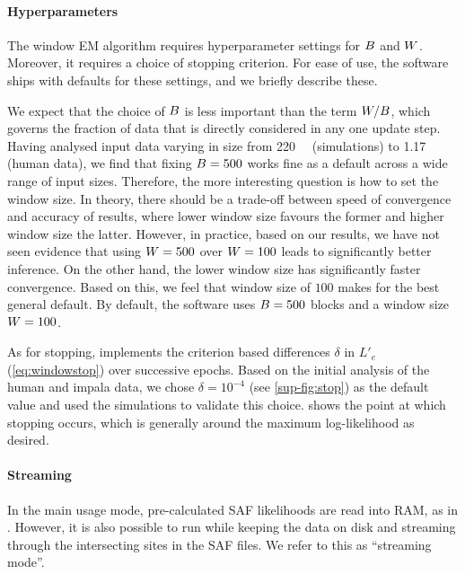 \paragraph{Hyperparameters}

The window EM algorithm requires hyperparameter settings for $B$ and $W$.
Moreover, it requires a choice of stopping criterion.
For ease of use, the \winsfs software ships with defaults for these settings, and we briefly describe these.

We expect that the choice of $B$ is less important than the term $W / B$, which governs the fraction of data that is directly considered in any one update step.
Having analysed input data varying in size from \SI{220}{\mega\bases} (simulations) to \SI{1.17}{\giga\bases} (human data), we find that fixing $B = 500$ works fine as a default across a wide range of input sizes.
Therefore, the more interesting question is how to set the window size.
In theory, there should be a trade-off between speed of convergence and accuracy of results, where lower window size favours the former and higher window size the latter.
However, in practice, based on our results, we have not seen evidence that using $W = 500$ over $W = 100$ leads to significantly better inference.
On the other hand, the lower window size has significantly faster convergence.
Based on this, we feel that window size of $100$ makes for the best general default.
By default, the \winsfs software uses $B = 500$ blocks and a window size $W = 100$.

As for stopping, \winsfs implements the criterion based differences $\delta$ in $L'_{e}$ (\cref{eq:windowstop}) over successive epochs.
Based on the initial analysis of the human and impala data, we chose $\delta = 10^{-4}$ (see \cref{sup-fig:stop}) as the default value and used the simulations to validate this choice.
 shows the point at which stopping occurs, which is generally around the maximum log-likelihood as desired.

\paragraph{Streaming}

In the main usage mode, pre-calculated SAF likelihoods are read into RAM, as in \realsfs.
However, it is also possible to run \winsfs while keeping the data on disk and streaming through the intersecting sites in the SAF files.
We refer to this as \enquote{streaming mode}.

